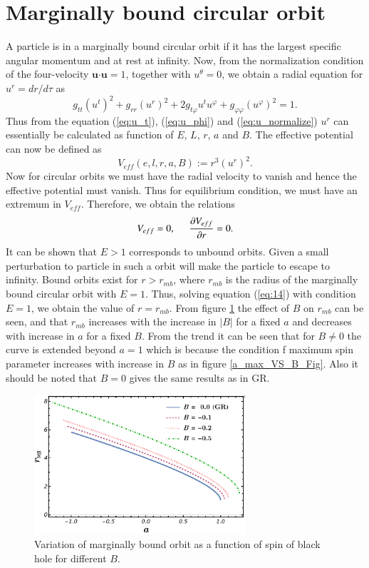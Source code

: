 \documentclass[12pt,a4paper,oneside]{book}
\newcommand{\eq}[2]{\begin{equation} \label{eq:#1} #2 \end{equation}}
\newcommand{\Eref}[1]{(\ref{eq:#1})}
\begin{document}
\section{Marginally bound circular orbit}
A particle is in a marginally bound circular orbit if it has the largest specific angular momentum and at rest at infinity. Now, from the normalization condition of the four-velocity $\boldsymbol{u}\boldsymbol{\cdot }\boldsymbol{u}=1$, together with $u^{\theta }=0$, we obtain a radial equation for $u^r=dr/d\tau$ as
\eq{u_normalize}{g_{tt}{\left(u^t\right)}^2+g_{rr}{\left(u^r\right)}^2+2g_{t\varphi }u^tu^{\varphi }+g_{\varphi \varphi }{\left(u^{\varphi }\right)}^2=1.} 
Thus from the equation \Eref{u_t}, \Eref{u_phi} and \Eref{u_normalize} $u^r$ can essentially be calculated as function of $E$, $L$, $r$, $a$ and $B$. The effective potential can now be defined as \cite{Hartle_Gravity_book,Shapiro_Teukolsky_book} 
\eq{Veff}{V_{eff}\left(e,l,r,a,B\right):=r^3{\left(u^r\right)}^2.}
Now for circular orbits we must have the radial velocity to vanish and hence the effective potential must vanish. Thus for equilibrium condition, we must have an extremum in $V_{eff}$. Therefore, we obtain the relations
\eq{14}{V_{eff}=0,\hspace{0.5cm}\frac{\partial V_{eff}}{\partial r}=0.}
It can be shown that $E>1$ corresponds to unbound orbits. Given a small perturbation to particle in such a orbit will make the particle to escape to infinity. Bound orbits exist for $r>r_{mb}$, where $r_{mb}$ is the radius of the marginally bound circular orbit with  $E=1.$ Thus, solving equation \Eref{14} with condition $E=1$, we obtain the value of $r=r_{mb}$. From figure \ref{r_MB_r_Vs_a} the effect of $B$ on $r_{mb}$ can be seen, and that $r_{mb}$ increases with the increase in $|B|$ for a fixed $a$ and decreases with increase in $a$ for a fixed $B$. From the trend it can be seen that for $B\ne0$ the curve is extended beyond $a=1$ which is because the condition f maximum spin parameter increases with increase in $B$ as in figure \ref{a_max_VS_B_Fig}. Also it should be noted that $B=0$ gives the same results as in GR.

\begin{figure}[H]
\centering
    \includegraphics[width=0.7\textwidth]{r_MB_r_Vs_a.pdf}
    \caption{\centering Variation of marginally bound orbit as a function of spin of black hole for different $B$.}
    \label{r_MB_r_Vs_a}
\end{figure}
\end{document}
